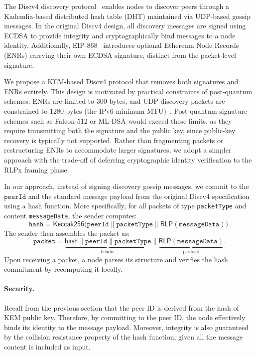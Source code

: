 The Discv4 discovery protocol~\cite{ethereum_discv4} enables nodes to discover peers through a Kademlia-based distributed hash table (DHT) maintained via UDP-based gossip messages.
In the original Discv4 design, all discovery messages are signed using ECDSA to provide integrity and cryptographically bind messages to a node identity.
Additionally, EIP-868~\cite{eip868} introduces optional Ethereum Node Records (ENRs) carrying their own ECDSA signature, distinct from the packet-level signature.

We propose a KEM-based Discv4 protocol that removes both signatures and ENRs entirely.
This design is motivated by practical constraints of post-quantum schemes: ENRs are limited to 300 bytes, and UDP discovery packets are constrained to 1280 bytes (the IPv6 minimum MTU)~\cite{rfc8200_ipv6_min_mtu}. 
Post-quantum signature schemes such as Falcon-512 or ML-DSA would exceed these limits, as they require transmitting both the signature and the public key, since public-key recovery is typically not supported.
Rather than fragmenting packets or restructuring ENRs to accommodate larger signatures, we adopt a simpler approach with the trade-off of deferring cryptographic identity verification to the RLPx framing phase.

In our approach, instead of signing discovery gossip messages, we commit to the $\texttt{peerId}$ and the standard message payload from the original Discv4 specification using a hash function.
More specifically, for all packets of type \texttt{packetType} and content \texttt{messageData}, the sender computes:
\begin{equation}\label{eq:discovery-hash}
\texttt{hash} = \mathsf{Keccak256}\big(\texttt{peerId} \parallel \texttt{packetType} \parallel \mathsf{RLP}(\texttt{messageData}) \big). 
\end{equation}
The sender then assembles the packet as:
\begin{equation}\label{eq:discovery-packet}
\texttt{packet} = \underbrace{\mathsf{hash} \parallel \texttt{peerId} \parallel \texttt{packetType}}_{\text{header}} \parallel \underbrace{ \mathsf{RLP}(\texttt{messageData})}_{\text{payload}}.
\end{equation}
Upon receiving a packet, a node parses its structure and verifies the hash commitment by recomputing it locally.

\paragraph{Security.}\label{para:discovery-security} Recall from the previous section that the peer ID is derived from the hash of KEM public key.
Therefore, by committing to the peer ID, the node effectively binds its identity to the message payload.  
Moreover, integrity is also guaranteed by the collision resistance property of the hash function, given all the message content is included as input.


